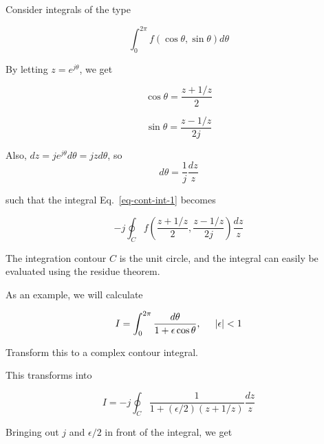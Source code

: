 
Consider integrals of the type

\begin{equation}
\int_0^{2 \pi} f(\cos \theta, \sin \theta) d \theta \label{eq-cont-int-1}
\end{equation} 

By letting $z=e^{j \theta}$, we get 

\begin{equation}
\cos \theta = \frac{z + 1/z}{2}
\end{equation} 

\begin{equation}
\sin \theta = \frac{z - 1/z}{2j}
\end{equation} 

Also, $dz = j e^{j \theta} d \theta = j z d \theta$, so
\begin{equation}
d \theta = \frac{1}{j}\frac{dz}{z}
\end{equation} 

such that the integral Eq.~\ref{eq-cont-int-1} becomes

\begin{equation}
-j \oint_{{C}} f\left(\frac{z + 1/z}{2}, \frac{z - 1/z}{2j}\right)
\frac{dz}{z}
\end{equation} 

The integration contour ${C}$ is the unit circle, and the integral can easily be evaluated using the residue theorem.

As an example, we will calculate

\begin{equation}
I = \int_0^{2 \pi} \frac{d \theta}{1 + \epsilon \cos \theta}, \hspace{0.5cm}
|\epsilon| < 1
\end{equation} 

\begin{cue}
Transform this to a complex contour integral.
\end{cue}

This transforms into

\begin{equation}
I = -j \oint_{{C}} \frac{1}{1 + (\epsilon / 2)\left(z + 1/z\right)}
\frac{dz}{z}
\end{equation} 

Bringing out $j$ and $\epsilon / {2}$ in front of the integral, we get

